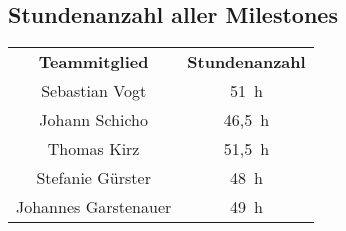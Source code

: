 \begin{landscape}
    \subsection{Stundenanzahl aller Milestones}
    \begin{center}
        \begin{tabular}{ c c }
            \textbf{Teammitglied} & \textbf{Stundenanzahl} \\
            Sebastian Vogt & 51~h\\
            Johann Schicho & 46,5~h\\
            Thomas Kirz & 51,5~h\\
            Stefanie Gürster & 48~h\\
            Johannes Garstenauer & 49~h
        \end{tabular}
    \end{center}
\end{landscape}